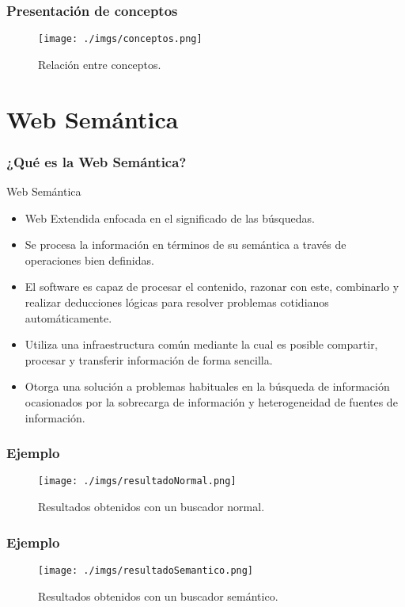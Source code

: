 \documentclass{beamer}
\begin{document}
\begin{frame}
\frametitle{Presentación de conceptos}
\begin{figure}[H] %
\begin{center}
\texttt{[image: ./imgs/conceptos.png]}
\caption{Relación entre conceptos.}
\end{center}
\end{figure}
\end{frame}

\section{Web Semántica} 
\begin{frame}
\frametitle{¿Qué es la Web Semántica?} 
\begin{block}{Web Semántica}
\begin{itemize}
\item<1-> Web Extendida enfocada en el significado de las búsquedas.
\item<2-> Se procesa la información en términos de su semántica a través de operaciones bien definidas.
\item<3-> El software es capaz de procesar el contenido, razonar con este, combinarlo y realizar deducciones lógicas para resolver problemas cotidianos automáticamente.
\item<4-> Utiliza una infraestructura común mediante la cual es posible compartir, procesar y transferir información de forma sencilla.
\item<5-> Otorga una solución a problemas habituales en la búsqueda de información ocasionados por la sobrecarga de información y heterogeneidad de fuentes de información.
\end{itemize}
\end{block}
\end{frame}
\begin{frame}
\frametitle{Ejemplo} 
\begin{figure}[H] %
\begin{center}
\texttt{[image: ./imgs/resultadoNormal.png]}
\caption{Resultados obtenidos con un buscador normal.}
\end{center}
\end{figure}
\end{frame}
\begin{frame}
\frametitle{Ejemplo} 
\begin{figure}[H] %
\begin{center}
\texttt{[image: ./imgs/resultadoSemantico.png]}
\caption{Resultados obtenidos con un buscador semántico.}
\end{center}
\end{figure}
\end{frame}
\end{document}
